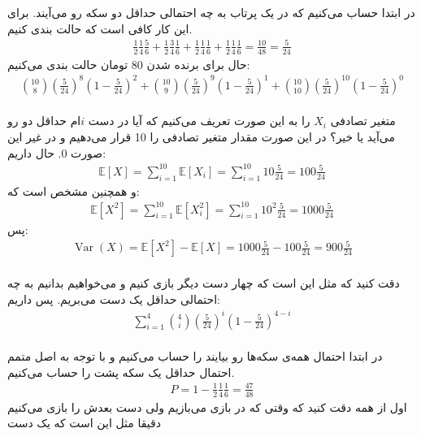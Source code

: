 \\
\\
در ابتدا حساب می‌کنیم که در یک پرتاب به چه احتمالی حداقل دو سکه رو می‌آیند. برای این کار کافی است
که حالت بندی کنیم.
\begin{gather*}
    \frac{1}{2} \frac{1}{4} \frac{5}{6} + \frac{1}{2} \frac{3}{4} \frac{1}{6} + \frac{1}{2} \frac{1}{4} \frac{1}{6} + \frac{1}{2} \frac{1}{4} \frac{1}{6}
    = \frac{10}{48} = \frac{5}{24}
\end{gather*}
حال برای برنده شدن 80 تومان حالت بندی می‌کنیم:
\begin{gather*}
    {10 \choose 8} (\frac{5}{24})^8 (1-\frac{5}{24})^2 + {10 \choose 9} (\frac{5}{24})^9 (1-\frac{5}{24})^1 + {10 \choose 10} (\frac{5}{24})^{10} (1-\frac{5}{24})^0
\end{gather*}
\\
متغیر تصادفی
$X_i$
را به این صورت تعریف می‌کنیم که آیا در دست
$i$ام
حداقل دو رو می‌آید یا خیر؟ در این صورت مقدار متغیر تصادفی را 10 قرار می‌دهیم و در غیر این صورت 0.
حال داریم:
\begin{gather*}
    \mathbb{E} [X] = \sum_{i=1}^{10} \mathbb{E} [X_i] = \sum_{i=1}^{10} 10 \frac{5}{24} = 100 \frac{5}{24}
\end{gather*}
و همچنین مشخص است که:
\begin{gather*}
    \mathbb{E} [X^2] = \sum_{i=1}^{10} \mathbb{E} [X_i^2] = \sum_{i=1}^{10} 10^2 \frac{5}{24} = 1000 \frac{5}{24}
\end{gather*}
پس:
\begin{gather*}
    \operatorname{Var}(X) = \mathbb{E} [X^2] - \mathbb{E} [X] = 1000 \frac{5}{24} - 100 \frac{5}{24} = 900 \frac{5}{24}
\end{gather*}
\\
دقت کنید که مثل این است که چهار دست دیگر بازی کنیم و می‌خواهیم بدانیم به چه احتمالی حداقل یک دست می‌بریم.
پس داریم:
\begin{gather*}
    \sum_{i=1}^4 {4 \choose i} (\frac{5}{24})^{i} (1-\frac{5}{24})^{4-i}
\end{gather*}
\\
در ابتدا احتمال همه‌ی سکه‌ها رو بیایند را حساب می‌کنیم و با توجه به اصل متمم احتمال حداقل یک سکه پشت را حساب می‌کنیم.
\begin{gather*}
    P = 1 - \frac{1}{2} \frac{1}{4} \frac{1}{6} = \frac{47}{48}
\end{gather*}
اول از همه دقت کنید که وقتی که در بازی می‌بازیم ولی دست بعدش را بازی می‌کنیم دقیقا مثل این است که یک دست
